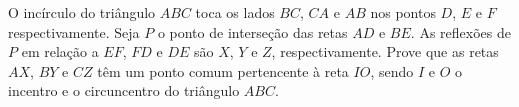 O incírculo do triângulo $ABC$ toca os lados $BC$, $CA$ e $AB$ nos pontos $D$, $E$ e $F$ respectivamente.
Seja $P$ o ponto de interseção das retas $AD$ e $BE$. As reflexões de $P$ em relação a $EF$, $FD$ e $DE$ são $X$, $Y$ e $Z$, respectivamente.
Prove que as retas $AX$, $BY$ e $CZ$ têm um ponto comum pertencente à reta $IO$, sendo $I$ e $O$ o incentro e o circuncentro do triângulo $ABC$.